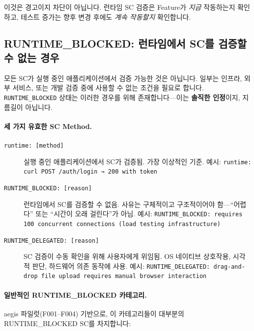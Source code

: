 \documentclass[11pt,a4paper,openright,twoside]{report}
\begin{document}
이것은 경고이지 차단이 아닙니다. 런타임 SC 검증은 Feature가 \emph{지금} 작동하는지 확인하고, 테스트 증가는 향후 변경 후에도 \emph{계속 작동할지} 확인합니다.

\subsection{RUNTIME\_BLOCKED: 런타임에서 SC를 검증할 수 없는 경우}

모든 SC가 실행 중인 애플리케이션에서 검증 가능한 것은 아닙니다. 일부는 인프라, 외부 서비스, 또는 개발 검증 중에 사용할 수 없는 조건을 필요로 합니다. \texttt{RUNTIME\_BLOCKED} 상태는 이러한 경우를 위해 존재합니다---이는 \textbf{솔직한 인정}이지, 지름길이 아닙니다.

\paragraph{세 가지 유효한 SC Method.}

\begin{description}
  \item[\texttt{runtime: [method]}] 실행 중인 애플리케이션에서 SC가 검증됨. 가장 이상적인 기준. 예시: \texttt{runtime: curl POST /auth/login → 200 with token}
  \item[\texttt{RUNTIME\_BLOCKED: [reason]}] 런타임에서 SC를 검증할 수 없음. 사유는 구체적이고 구조적이어야 함---``어렵다'' 또는 ``시간이 오래 걸린다''가 아님. 예시: \texttt{RUNTIME\_BLOCKED: requires 100 concurrent connections (load testing infrastructure)}
  \item[\texttt{RUNTIME\_DELEGATED: [reason]}] SC 검증이 수동 확인을 위해 사용자에게 위임됨. OS 네이티브 상호작용, 시각적 판단, 하드웨어 의존 동작에 사용. 예시: \texttt{RUNTIME\_DELEGATED: drag-and-drop file upload requires manual browser interaction}
\end{description}

\paragraph{일반적인 RUNTIME\_BLOCKED 카테고리.}

aegis 파일럿(F001--F004) 기반으로, 이 카테고리들이 대부분의 RUNTIME\_BLOCKED SC를 차지합니다:
\end{document}
